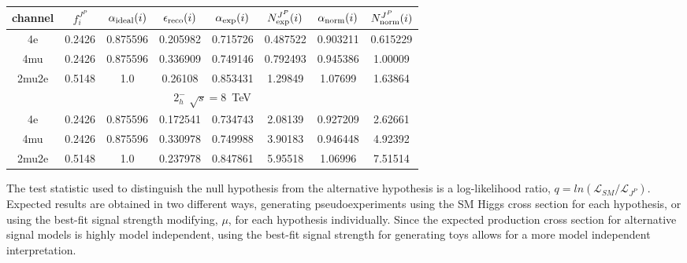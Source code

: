 \begin{table}[b]
\begin{tabular}{c c c c c c c c}
channel & $f_{i}^{J^P}$ & $\alpha_{\rm ideal} (i)$ & $\epsilon_{\rm reco} (i)$ & $\alpha_{\rm exp} (i)$ & $N^{J^P}_{\rm exp} (i)$ & $\alpha_{\rm norm} (i)$ & $N^{J^P}_{\rm norm} (i)$\\ \hline 
4e & 0.2426 & 0.875596 & 0.205982 & 0.715726
 & 0.487522%
 & 0.903211 & 0.615229 \\ \hline 
4mu & 0.2426 & 0.875596 & 0.336909 & 0.749146
 & 0.792493%
 & 0.945386 & 1.00009 \\ \hline 
2mu2e & 0.5148 & 1.0  & 0.26108 & 0.853431
 & 1.29849%
 & 1.07699 & 1.63864 \\ \hline \hline 

 \multicolumn{8}{|c|}{$2^{-}_{h}$ $\sqrt{s}=8$~TeV} \\ \hline 

4e & 0.2426 & 0.875596 & 0.172541 & 0.734743
 & 2.08139%
 & 0.927209 & 2.62661 \\ \hline 
4mu & 0.2426 & 0.875596 & 0.330978 & 0.749988
 & 3.90183%
 & 0.946448 & 4.92392 \\ \hline 
2mu2e & 0.5148 & 1.0  & 0.237978 & 0.847861
 & 5.95518%
 & 1.06996 & 7.51514 \\ \hline \hline 
\end{tabular}
\label{table:HZZ4lyieldcorr_spin2_HD}
\end{table}

The test statistic used to distinguish the null hypothesis from
the alternative hypothesis is a log-likelihood ratio,  
$q=ln(\mathscr{L}_{SM}/\mathscr{L}_{J^P})$. Expected results are
obtained in two different ways, generating pseudoexperiments using
the SM Higgs cross section for each hypothesis, 
or using the best-fit signal strength modifying, $\mu$, for each
hypothesis individually.  Since the expected production cross 
section for alternative signal 
models is highly model independent, using the best-fit signal
strength for generating toys allows for a more model independent 
interpretation.

